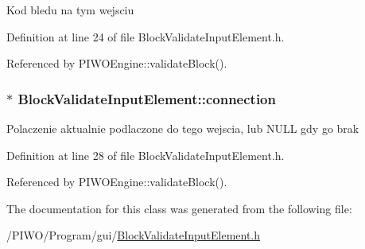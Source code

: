 Kod bledu na tym wejsciu 

Definition at line 24 of file BlockValidateInputElement.h.

Referenced by PIWOEngine::validateBlock().\hypertarget{classBlockValidateInputElement_fc5b397cb97ff9fe22948a97b3b782d1}{
\subsubsection[connection]{$\ast$ {\bf BlockValidateInputElement::connection}}}
\label{classBlockValidateInputElement_fc5b397cb97ff9fe22948a97b3b782d1}


Polaczenie aktualnie podlaczone do tego wejscia, lub NULL gdy go brak 

Definition at line 28 of file BlockValidateInputElement.h.

Referenced by PIWOEngine::validateBlock().

The documentation for this class was generated from the following file:\begin{CompactItemize}
\item 
/PIWO/Program/gui/\hyperlink{BlockValidateInputElement_8h}{BlockValidateInputElement.h}\end{CompactItemize}
